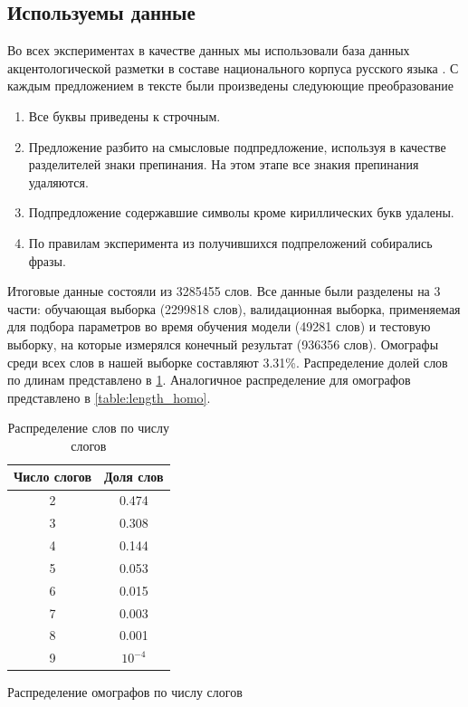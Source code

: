 \documentclass[14pt, a4paper, russian]{report}
\begin{document}
\begin{normalsize}
\section{Используемы данные}
\label{prepare}
Во всех экспериментах в качестве данных мы использовали база данных акцентологической разметки в составе национального корпуса русского языка \cite{grishina}. С каждым предложением в тексте были произведены следуюющие преобразование
\begin{enumerate}
	\item Все буквы приведены к строчным.
	\item Предложение разбито на смысловые подпредложение, используя в качестве разделителей знаки препинания. На этом этапе все знакия препинания удаляются.
	\item Подпредложение содержавшие символы кроме кириллических букв удалены.
	\item По правилам эксперимента из получившихся подпреложений собирались фразы.
\end{enumerate}
Итоговые данные состояли из 3285455  слов. Все данные были разделены на 3 части: обучающая выборка (2299818 слов), валидационная выборка, применяемая для подбора параметров во время обучения модели (49281 слов) и тестовую  выборку, на которые измерялся конечный результат (936356 слов).
Омографы среди всех слов в нашей выборке составляют 3.31\%. Распределение долей слов по длинам представлено в \cref{table:length_gen}. Аналогичное распределение для омографов представлено в \cref{table:length_homo}.

\begin{table}[H]
	\caption{Распределение слов по числу слогов}
	
	\begin{small}
		\begin{center}
			\begin{tabular}{|c|c|}
				\hline
				Число слогов & Доля слов\\
				\hline
				2 &  0.474 \\
				\hline
				3 & 0.308 \\
				\hline
				4 &0.144 \\
				\hline
				5 &0.053\\
				\hline
				6 & 0.015  \\
				\hline
				7 & 0.003\\
				\hline
				8 & 0.001\\
				\hline
				9 & $10^{-4}$\\
				\hline
							\end{tabular}
			\end{center}
		\end{small}
	\label{table:length_gen}
\end{table}	
\begin{table}[H]
	\caption{Распределение омографов по числу слогов}
	

\end{table}
\end{normalsize}
\end{document}
